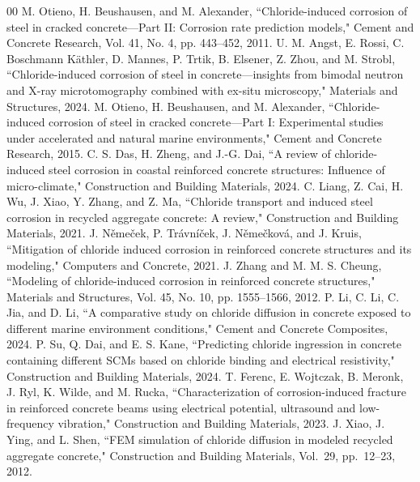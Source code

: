 \documentclass[conference]{IEEEtran}
\begin{document}
\begin{thebibliography}{00}
M. Otieno, H. Beushausen, and M. Alexander, ``Chloride-induced corrosion of steel in cracked concrete—Part II: Corrosion rate prediction models," Cement and Concrete Research, Vol. 41, No. 4, pp. 443--452, 2011.
U. M. Angst, E. Rossi, C. Boschmann K\"athler, D. Mannes, P. Trtik,
B. Elsener, Z. Zhou, and M. Strobl, ``Chloride-induced corrosion of steel in concrete—insights from bimodal neutron and X-ray microtomography combined with ex-situ microscopy," Materials and Structures, 2024.
M. Otieno, H. Beushausen, and M. Alexander, ``Chloride-induced corrosion of steel in cracked concrete—Part I: Experimental studies under accelerated and natural marine environments,"
Cement and Concrete Research, 2015.
C. S. Das, H. Zheng, and J.-G. Dai, ``A review of chloride-induced steel corrosion in coastal reinforced concrete structures: Influence of micro-climate," Construction and Building Materials, 2024.
 C. Liang, Z. Cai, H. Wu, J. Xiao, Y. Zhang, and Z. Ma, ``Chloride transport and induced steel corrosion in recycled aggregate concrete: A review," Construction and Building Materials, 2021.
J. N\v{e}me\v{c}ek, P. Tr\'avn\'i\v{c}ek, J. N\v{e}me\v{c}kov\'a, and J. Kruis, ``Mitigation of chloride induced corrosion in reinforced concrete structures and its modeling," Computers and Concrete, 2021.  
 J. Zhang and M. M. S. Cheung, ``Modeling of chloride-induced corrosion in reinforced concrete structures," Materials and Structures, Vol. 45, No. 10, pp. 1555--1566, 2012.
 P. Li, C. Li, C. Jia, and D. Li, ``A comparative study on chloride diffusion in concrete exposed to different marine environment conditions," Cement and Concrete Composites, 2024.  
 P. Su, Q. Dai, and E. S. Kane, ``Predicting chloride ingression in concrete containing different SCMs based on chloride binding and electrical resistivity," Construction and Building Materials, 2024.  
 T. Ferenc, E. Wojtczak, B. Meronk, J. Ryl, K. Wilde, and M. Rucka, ``Characterization of corrosion-induced fracture in reinforced concrete beams using electrical potential, ultrasound and low-frequency vibration," Construction and Building Materials, 2023. 
J. Xiao, J. Ying, and L. Shen, ``FEM simulation of chloride diffusion in modeled recycled aggregate concrete," Construction and Building Materials, Vol.~29, pp.~12--23, 2012. 

\end{thebibliography}
\end{document}
